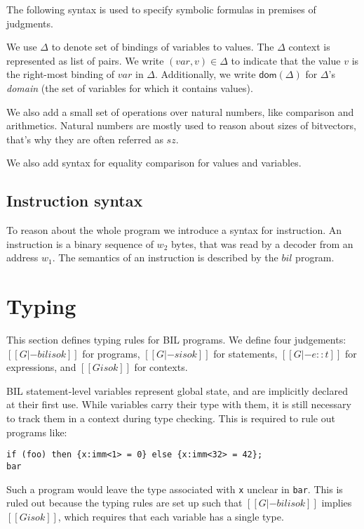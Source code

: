 \documentclass[11pt]{article}
\begin{document}
The following syntax is used to specify symbolic formulas in premises
of judgments.

We use $\Delta$ to denote set of bindings of variables to values. The
$\Delta$ context is represented as list of pairs. We write
$(var,v) \in \Delta$ to indicate that the value $v$ is the right-most
binding of $var$ in $\Delta$.  Additionally, we write
$\mathsf{dom}(\Delta)$ for $\Delta$'s {\em domain} (the set of
variables for which it contains values).

We also add a small set of operations over natural numbers, like
comparison and arithmetics. Natural numbers are mostly used to reason
about sizes of bitvectors, that's why they are often referred as
$\mathit{sz}$.

We also add syntax for equality comparison for values and variables.


\ottgrammartabular{
\ottdelta\ottinterrule
}

\ottgrammartabular{
\ottformula\ottinterrule
}

\ottgrammartabular{
\ottnat\ottinterrule
}

\subsection{Instruction syntax}
\label{sec:insn}

To reason about the whole program we introduce a syntax for
instruction. An instruction is a binary sequence of $\mathit{w_2}$
bytes, that was read by a decoder from an address $\mathit{w_1}$. The
semantics of an instruction is described by the $\mathit{bil}$ program.

\ottgrammartabular{
\ottinsn\ottinterrule
}

\clearpage

\section{Typing}
\label{sec:typing}

This section defines typing rules for BIL programs.  We define four
judgements: $[[G |- bil is ok]]$ for programs, $[[G |- s is ok]]$ for
statements, $[[G |- e :: t]]$ for expressions, and $[[G is ok]]$ for
contexts.

BIL statement-level variables represent global state, and are
implicitly declared at their first use.  While variables carry their
type with them, it is still necessary to track them in a context
during type checking.  This is required to rule out programs like:
\begin{verbatim}
if (foo) then {x:imm<1> = 0} else {x:imm<32> = 42};
bar
\end{verbatim}
Such a program would leave the type associated with {\tt x} unclear in
{\tt bar}.  This is ruled out because the typing rules are set up such
that $[[G |- bil is ok]]$ implies $[[G is ok]]$, which requires that
each variable has a single type.
\end{document}
